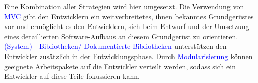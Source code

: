 \documentclass[enabledeprecatedfontcommands,fontsize=11pt,paper=a4,twoside]{scrartcl}
\newcounter{one}
\newcommand{\cb}[1]{{\textcolor{blue}{#1}}}
\begin{document}
	\begin{onehalfspace}
		Eine Kombination aller Strategien wird hier umgesetzt. Die Verwendung von \cb{MVC} gibt den Entwicklern ein weitverbreitetes, ihnen bekanntes Grundgerüstes vor und ermöglicht es den Entwicklern, sich beim Entwurf und der Umsetzung eines detaillierten Software-Aufbaus an diesem Grundgerüst zu orientieren. \cb{(System) - Bibliotheken/ Dokumentierte Bibliotheken} unterstützen den Entwickler zusätzlich in der Entwicklungsphase.
		Durch \cb{Modularisierung} können geeignete Arbeitspakete auf die Entwickler verteilt werden, sodass sich ein Entwickler auf diese Teile fokussieren kann. \\ \\ \\ \\
	\end{onehalfspace}
	\newpage
\end{document}
